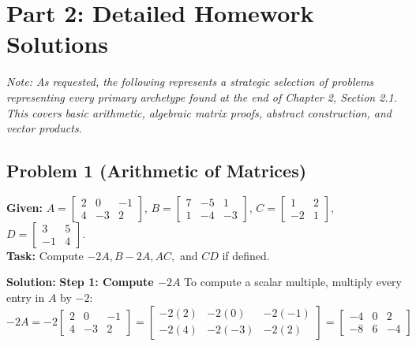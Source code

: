 \documentclass{article}
\begin{document}
\newpage
\section*{Part 2: Detailed Homework Solutions}

\textit{Note: As requested, the following represents a strategic selection of problems representing every primary archetype found at the end of Chapter 2, Section 2.1. This covers basic arithmetic, algebraic matrix proofs, abstract construction, and vector products.}

\subsection*{Problem 1 (Arithmetic of Matrices)}
\textbf{Given:} 
$A = \begin{bmatrix} 2 & 0 & -1 \\ 4 & -3 & 2 \end{bmatrix}$, 
$B = \begin{bmatrix} 7 & -5 & 1 \\ 1 & -4 & -3 \end{bmatrix}$, 
$C = \begin{bmatrix} 1 & 2 \\ -2 & 1 \end{bmatrix}$, 
$D = \begin{bmatrix} 3 & 5 \\ -1 & 4 \end{bmatrix}$. \\
\textbf{Task:} Compute $-2A, B - 2A, AC,$ and $CD$ if defined.

\textbf{Solution:}
\textbf{Step 1: Compute $-2A$}
To compute a scalar multiple, multiply every entry in $A$ by $-2$:
\[ -2A = -2 \begin{bmatrix} 2 & 0 & -1 \\ 4 & -3 & 2 \end{bmatrix} = \begin{bmatrix} -2(2) & -2(0) & -2(-1) \\ -2(4) & -2(-3) & -2(2) \end{bmatrix} = \begin{bmatrix} -4 & 0 & 2 \\ -8 & 6 & -4 \end{bmatrix} \]
\end{document}
